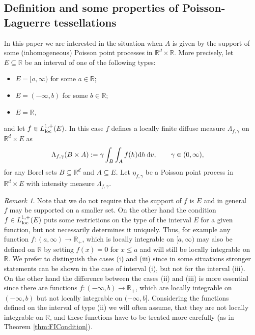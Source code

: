 \documentclass[11pt,a4paper]{article}
\theoremstyle{plain}
\theoremstyle{definition}
\theoremstyle{remark}
\newtheorem{remark}[theorem]{Remark}
\def\RR{\mathbb{R}}
\newcommand{\dd}{{\rm d}}
\begin{document}
\subsection{Definition and some properties of Poisson-Laguerre tessellations} \label{sec:randomL}
In this paper we are interested in the situation when $A$ is given by the support of some (inhomogeneous) Poisson point processes in $\RR^d\times\RR$. More precisely, let $E \subseteq \RR$ be an interval of one of the following types: 
\begin{itemize}
    \item[(i)] $E=[a,\infty)$ for some $a\in\RR$;
    \item[(ii)] $E=(-\infty,b)$ for some $b\in\RR$; 
    \item[(iii)] $E=\RR$, 
\end{itemize}
and let $f\in L_{{\rm loc}}^{1,+}(E)$. In this case $f$ defines a locally finite diffuse measure $\Lambda_{f,\gamma}$ on $\RR^d\times E$ as 
\begin{align*}
    \Lambda_{f,\gamma}(B\times A):=\gamma\int_B\int_A f(h) \dd h \,\dd v,\qquad \gamma\in(0,\infty),
\end{align*}
for any Borel sets $B \subseteq \RR^d$ and $A \subseteq E$. Let $\eta_{f,\gamma}$ be a Poisson point process in $\RR^d \times E$ with intensity measure $\Lambda_{f,\gamma}$. 

\begin{remark}\label{rmk:intervals}
    Note that we do not require that the support of $f$ is $E$ and in general $f$ may be supported on a smaller set. On the other hand the condition $f\in L_{\rm loc}^{1,+}(E)$ puts some restrictions on the type of the interval $E$ for a given function, but not necessarily determines it uniquely. Thus, for example any function $f\colon (a,\infty)\to \RR_+$, which is locally integrable on $[a,\infty)$ may also be defined on $\RR$ by setting $f(x)=0$ for $x\leq a$ and will still be locally integrable on $\RR$. We prefer to distinguish the cases (i) and (iii) since in some situations stronger statements can be shown in the case of interval (i), but not for the interval (iii). On the other hand the difference between the cases (ii) and (iii) is more essential since there are functions $f\colon (-\infty,b)\to\RR_+$, which are locally integrable on $(-\infty,b)$ but not locally integrable on $(-\infty,b]$. Considering the functions defined on the interval of type (ii) we will often assume, that they are not locally integrable on $\RR$, and these functions have to be treated more carefully (as in Theorem \ref{thm:FICondition}). 
\end{remark}
\end{document}
